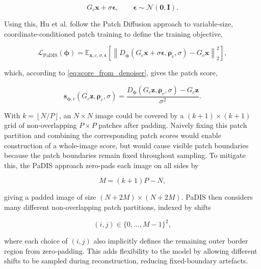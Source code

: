 \begin{equation}
G_c\mathbf{x}+\sigma\boldsymbol{\epsilon},
\qquad
\boldsymbol{\epsilon}\sim\mathcal{N}(\mathbf{0},\mathbf{I}).
\label{eq:noisy_patch}
\end{equation}

Using this, Hu et al. \cite{hu_learning_2024} follow the Patch Diffusion 
\cite{wang_patch_2023-1} approach to variable-size, coordinate-conditioned patch training to define the training objective,

\begin{equation}
\mathcal L_{\mathrm{PaDIS}}(\boldsymbol{\phi})
=
\mathbb E_{\mathbf{x},c,\sigma,\boldsymbol{\epsilon}}
\left[
\left\|
D_{\boldsymbol{\phi}}(G_c\mathbf{x}+\sigma\boldsymbol{\epsilon},\boldsymbol{\rho}_c,\sigma)
-
G_c\mathbf{x}
\right\|_2^2
\right],
\label{eq:padis_denoising_objective}
\end{equation}

which, according to \eqref{eq:score_from_denoiser}, gives the patch score,

\begin{equation}
\mathbf{s}_{\boldsymbol{\phi},c}(G_c\mathbf{z},\boldsymbol{\rho}_c,\sigma)
=
\frac{
D_{\boldsymbol{\phi}}(G_c\mathbf{z},\boldsymbol{\rho}_c,\sigma)
-
G_c\mathbf{z}
}{\sigma^2}.
\label{eq:padis_patch_score}
\end{equation}

With $k=\left\lfloor N/P \right\rfloor$, an $N\times N$ image could be covered by a $(k+1)\times(k+1)$ grid of non-overlapping $P\times P$ patches after padding. Naively fixing this patch partition and combining the corresponding patch scores would enable construction of a whole-image score, but would cause visible patch boundaries because the patch boundaries remain fixed throughout sampling. To mitigate this, the PaDIS approach zero-pads each image on all sides by

\begin{equation}
M=(k+1)P-N,
\label{eq:padis_padding}
\end{equation}

giving a padded image of size $(N+2M)\times(N+2M)$. PaDIS then considers many different non-overlapping patch partitions, indexed by shifts

\begin{equation}
(i,j)\in\{0,\dots,M-1\}^2,
\label{eq:padis_shifts}
\end{equation}

where each choice of $(i,j)$ also implicitly defines the remaining outer border region from zero-padding. This adds flexibility to the model by allowing different shifts to be sampled during reconstruction, reducing fixed-boundary artefacts.


